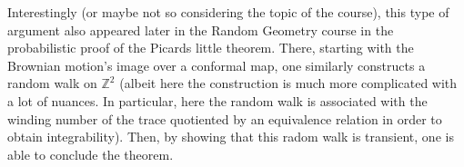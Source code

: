 \documentclass{article}
\begin{document}
Interestingly (or maybe not so considering the topic of the course), this type of argument also 
appeared later in the Random Geometry course in the probabilistic proof of the Picards little theorem.
There, starting with the Brownian motion's image over a conformal map, one similarly constructs a 
random walk on \(\mathbb{Z}^2\) (albeit here the construction is much more complicated with a lot 
of nuances. In particular, here the random walk is associated with the winding number of the trace 
quotiented by an equivalence relation in order to obtain integrability). Then, by showing that this 
radom walk is transient, one is able to conclude the theorem.
\end{document}
